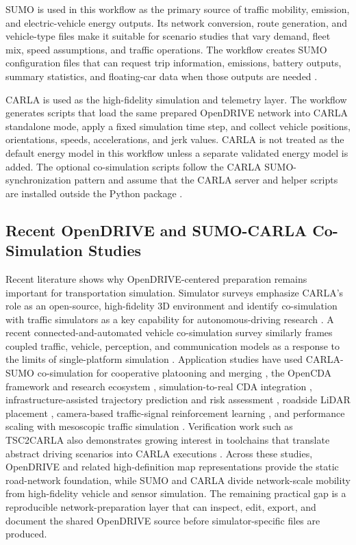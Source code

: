 \documentclass[10pt,numbered]{\selectedmanuscriptclass}
\begin{document}
SUMO is used in this workflow as the primary source of traffic mobility,
emission, and electric-vehicle energy outputs. Its network conversion, route
generation, and vehicle-type files make it suitable for scenario studies that
vary demand, fleet mix, speed assumptions, and traffic operations. The workflow
creates SUMO configuration files that can request trip information, emissions,
battery outputs, summary statistics, and floating-car data when those outputs
are needed \citep{eclipse2026sumodocs}.

CARLA is used as the high-fidelity simulation and telemetry layer. The workflow
generates scripts that load the same prepared OpenDRIVE network into CARLA
standalone mode, apply a fixed simulation time step, and collect vehicle
positions, orientations, speeds, accelerations, and jerk values. CARLA is not
treated as the default energy model in this workflow unless a separate validated
energy model is added. The optional co-simulation scripts follow the CARLA
SUMO-synchronization pattern and assume that the CARLA server and helper scripts
are installed outside the Python package \citep{carla2026docs}.

\subsection{Recent OpenDRIVE and SUMO-CARLA Co-Simulation Studies}

Recent literature shows why OpenDRIVE-centered preparation remains important
for transportation simulation. Simulator surveys emphasize CARLA's role as an
open-source, high-fidelity 3D environment and identify co-simulation with
traffic simulators as a key capability for autonomous-driving research
\citep{li2024choose, silva2024realistic}. A recent connected-and-automated
vehicle co-simulation survey similarly frames coupled traffic, vehicle,
perception, and communication models as a response to the limits of
single-platform simulation \citep{ashayer2025cosimulation}. Application studies
have used CARLA-SUMO co-simulation for cooperative platooning and merging
\citep{han2022strategic}, the OpenCDA framework and research ecosystem
\citep{xu2021opencda, xu2023opencdaecosystem}, simulation-to-real CDA integration
\citep{zheng2023opencdaros}, infrastructure-assisted trajectory prediction and
risk assessment \citep{cao2025segment}, roadside LiDAR placement
\citep{chen2024roadside}, camera-based traffic-signal reinforcement learning
\citep{azfar2025traffic}, and performance scaling with mesoscopic traffic
simulation \citep{varga2023optimizing}. Verification work such as TSC2CARLA
also demonstrates growing interest in toolchains that translate abstract
driving scenarios into CARLA executions \citep{borchers2025tsc2carla}. Across
these studies, OpenDRIVE and related high-definition map representations provide
the static road-network foundation, while SUMO and CARLA divide network-scale
mobility from high-fidelity vehicle and sensor simulation. The remaining
practical gap is a reproducible network-preparation layer that can inspect,
edit, export, and document the shared OpenDRIVE source before simulator-specific
files are produced.
\end{document}
